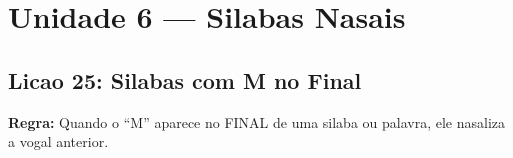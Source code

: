

\chapter{Unidade 6 --- Silabas Nasais}

\section{Licao 25: Silabas com M no Final}

\rotinasimples
{}



\textbf{Regra:} Quando o ``M'' aparece no FINAL de uma silaba ou palavra, ele nasaliza a vogal anterior.

